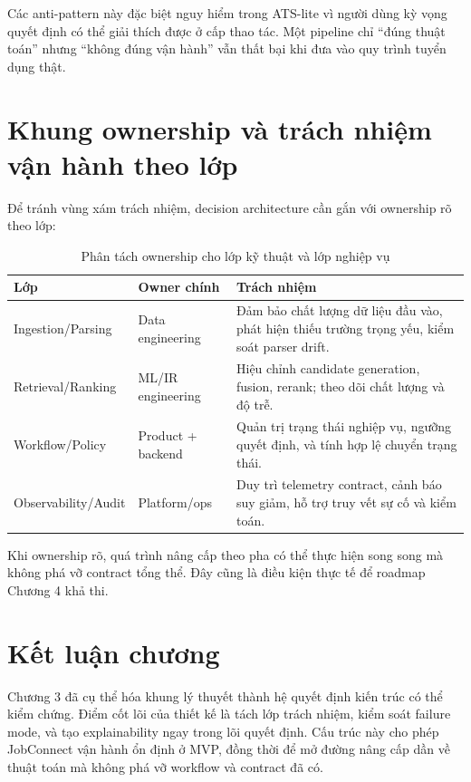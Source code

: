 Các anti-pattern này đặc biệt nguy hiểm trong ATS-lite vì người dùng kỳ vọng quyết định có thể giải thích được ở cấp thao tác. Một pipeline chỉ ``đúng thuật toán'' nhưng ``không đúng vận hành'' vẫn thất bại khi đưa vào quy trình tuyển dụng thật.

\section{Khung ownership và trách nhiệm vận hành theo lớp}

Để tránh vùng xám trách nhiệm, decision architecture cần gắn với ownership rõ theo lớp:

\begin{table}[H]
\caption{Phân tách ownership cho lớp kỹ thuật và lớp nghiệp vụ}
\centering
\begin{tabularx}{\textwidth}{p{}p{}X}
\toprule
\textbf{Lớp} & \textbf{Owner chính} & \textbf{Trách nhiệm}\\
\midrule
Ingestion/Parsing & Data engineering & Đảm bảo chất lượng dữ liệu đầu vào, phát hiện thiếu trường trọng yếu, kiểm soát parser drift.\\
Retrieval/Ranking & ML/IR engineering & Hiệu chỉnh candidate generation, fusion, rerank; theo dõi chất lượng và độ trễ.\\
Workflow/Policy & Product + backend & Quản trị trạng thái nghiệp vụ, ngưỡng quyết định, và tính hợp lệ chuyển trạng thái.\\
Observability/Audit & Platform/ops & Duy trì telemetry contract, cảnh báo suy giảm, hỗ trợ truy vết sự cố và kiểm toán.\\
\bottomrule
\end{tabularx}
\end{table}

Khi ownership rõ, quá trình nâng cấp theo pha có thể thực hiện song song mà không phá vỡ contract tổng thể. Đây cũng là điều kiện thực tế để roadmap Chương 4 khả thi.

\section{Kết luận chương}

Chương 3 đã cụ thể hóa khung lý thuyết thành hệ quyết định kiến trúc có thể kiểm chứng. Điểm cốt lõi của thiết kế là tách lớp trách nhiệm, kiểm soát failure mode, và tạo explainability ngay trong lõi quyết định. Cấu trúc này cho phép JobConnect vận hành ổn định ở MVP, đồng thời để mở đường nâng cấp dần về thuật toán mà không phá vỡ workflow và contract đã có.
